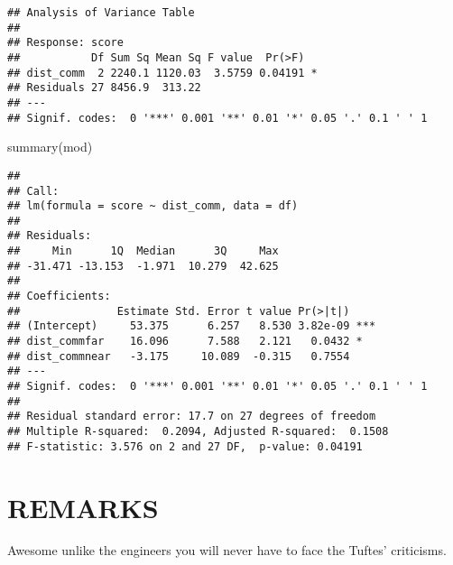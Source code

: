 \documentclass[
]{book}
\newenvironment{Shaded}{\begin{snugshade}}{\end{snugshade}}
\newcommand{\FunctionTok}[1]{\textcolor[rgb]{0.00,0.00,0.00}{#1}}
\newcommand{\NormalTok}[1]{#1}
\begin{document}
\begin{verbatim}
## Analysis of Variance Table
## 
## Response: score
##           Df Sum Sq Mean Sq F value  Pr(>F)  
## dist_comm  2 2240.1 1120.03  3.5759 0.04191 *
## Residuals 27 8456.9  313.22                  
## ---
## Signif. codes:  0 '***' 0.001 '**' 0.01 '*' 0.05 '.' 0.1 ' ' 1
\end{verbatim}

\begin{Shaded}
\begin{Highlighting}[]
\FunctionTok{summary}\NormalTok{(mod)}
\end{Highlighting}
\end{Shaded}

\begin{verbatim}
## 
## Call:
## lm(formula = score ~ dist_comm, data = df)
## 
## Residuals:
##     Min      1Q  Median      3Q     Max 
## -31.471 -13.153  -1.971  10.279  42.625 
## 
## Coefficients:
##               Estimate Std. Error t value Pr(>|t|)    
## (Intercept)     53.375      6.257   8.530 3.82e-09 ***
## dist_commfar    16.096      7.588   2.121   0.0432 *  
## dist_commnear   -3.175     10.089  -0.315   0.7554    
## ---
## Signif. codes:  0 '***' 0.001 '**' 0.01 '*' 0.05 '.' 0.1 ' ' 1
## 
## Residual standard error: 17.7 on 27 degrees of freedom
## Multiple R-squared:  0.2094, Adjusted R-squared:  0.1508 
## F-statistic: 3.576 on 2 and 27 DF,  p-value: 0.04191
\end{verbatim}

\hypertarget{remarks}{%
\chapter{REMARKS}\label{remarks}}

Awesome unlike the engineers you will never have to face the Tuftes' criticisms.

  
\end{document}
